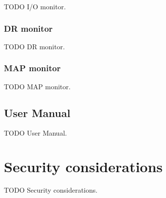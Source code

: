 TODO I/O monitor.


\subsubsection{DR monitor}

TODO DR monitor.


\subsubsection{MAP monitor}

TODO MAP monitor.


\subsection{User Manual}

TODO User Manual.


\section{Security considerations}
\label{sec:def_sec}

TODO Security considerations.
